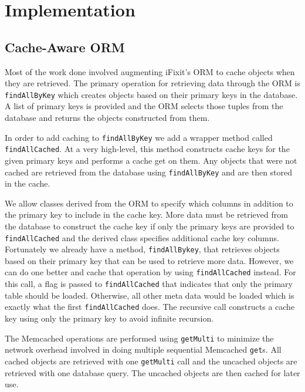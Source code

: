 \documentclass[12pt]{ucthesis}
\begin{document}
\section{Implementation}
\subsection{Cache-Aware ORM}
Most of the work done involved augmenting iFixit's ORM to cache objects when they are retrieved.
The primary operation for retrieving data through the ORM is {\tt findAllByKey} which creates objects based on their primary keys in the database.
A list of primary keys is provided and the ORM selects those tuples from the database and returns the objects constructed from them.

In order to add caching to {\tt findAllByKey} we add a wrapper method called {\tt findAllCached}.
At a very high-level, this method constructs cache keys for the given primary keys and performs a cache get on them.
Any objects that were not cached are retrieved from the database using {\tt findAllByKey} and are then stored in the cache.

We allow classes derived from the ORM to specify which columns in addition to the primary key to include in the cache key.
More data must be retrieved from the database to construct the cache key if only the primary keys are provided to {\tt findAllCached} and the derived class specifies additional cache key columns.
Fortunately we already have a method, {\tt findAllBykey}, that retrieves objects based on their primary key that can be used to retrieve more data.
However, we can do one better and cache that operation by using {\tt findAllCached} instead.
For this call, a flag is passed to {\tt findAllCached} that indicates that only the primary table should be loaded.
Otherwise, all other meta data would be loaded which is exactly what the first {\tt findAllCached} does.
The recursive call constructs a cache key using only the primary key to avoid infinite recursion.

The {\textsf Memcached} operations are performed using {\tt getMulti} to minimize the network overhead involved in doing multiple sequential {\textsf Memcached} {\tt get}s.
All cached objects are retrieved with one {\tt getMulti} call and the uncached objects are retrieved with one database query.
The uncached objects are then cached for later use.

\end{document}
